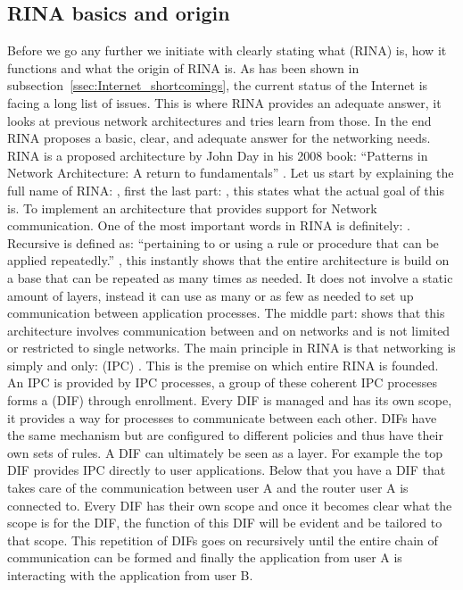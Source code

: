 \subsection{RINA basics and origin}
\label{ssec:RINAbasics}
Before we go any further we initiate with clearly stating what  (RINA) is, how it functions and what the origin of RINA is. As has been shown in subsection~\ref{ssec:Internet_shortcomings}, the current status of the Internet is facing a long list of issues. This is where RINA provides an adequate answer, it looks at previous network architectures and tries learn from those. In the end RINA proposes a basic, clear, and adequate answer for the networking needs.
\npar
RINA is a proposed architecture by John Day in his 2008 book: ``Patterns in Network Architecture: A return to fundamentals'' \citep{johnday2008}. 
Let us start by explaining the full name of RINA: , first the last part: , this states what the actual goal of this is. To implement an architecture that provides support for Network communication. One of the most important words in RINA is definitely: . Recursive is defined as: ``pertaining to or using a rule or procedure that can be applied repeatedly.'' \citep{website:recursive_definition}, 
this instantly shows that the entire architecture is build on a base that can be repeated as many times as needed. It does not involve a static amount of layers, instead it can use as many or as few as needed to set up communication between application processes. The middle part:  shows that this architecture involves communication between and on networks and is not limited or restricted to single networks.
\npar
The main principle in RINA is that networking is simply and only:  (IPC) \citep{johnday2008}. This is the premise on which entire RINA is founded. An IPC is provided by IPC processes, a group of these coherent IPC processes forms a  (DIF) through enrollment. Every DIF is managed and has its own scope, it provides a way for processes to communicate between each other. DIFs have the same mechanism but are configured to different policies and thus have their own sets of rules. A DIF can ultimately be seen as a layer. For example the top DIF provides IPC directly to user applications. Below that you have a DIF that takes care of the communication between user A and the router user A is connected to. Every DIF has their own scope and once it becomes clear what the scope is for the DIF, the function of this DIF will be evident and be tailored to that scope. This repetition of DIFs goes on recursively until the entire chain of communication can be formed and finally the application from user A is interacting with the application from user B.

